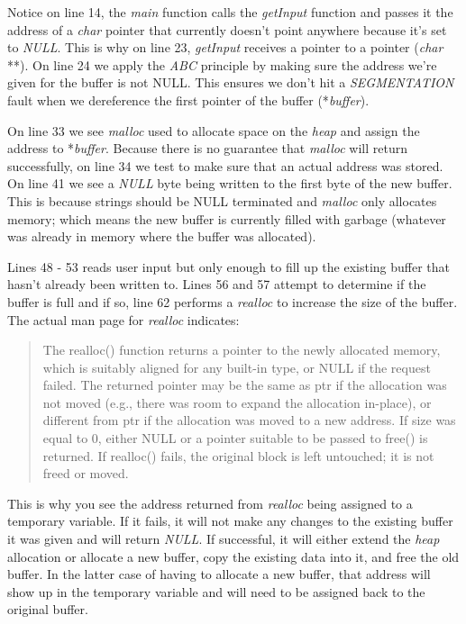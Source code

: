 \documentclass[../main.tex]{subfiles}
\begin{document}
	Notice on line 14, the \textit{main} function calls the \textit{getInput} function and passes it the address of a \textit{char} pointer that currently doesn't point anywhere because it's set to \textit{NULL}.  This is why on line 23, \textit{getInput} receives a pointer to a pointer (\textit{char} **).  On line 24 we apply the \textit{ABC} principle by making sure the address we're given for the buffer is not NULL.  This ensures we don't hit a \textit{SEGMENTATION} fault when we dereference the first pointer  of the buffer (*\textit{buffer}). 
	
	On line 33 we see \textit{malloc} used to allocate space on the \textit{heap} and assign the address to *\textit{buffer}.  Because there is no guarantee that \textit{malloc} will return successfully, on line 34 we test to make sure that an actual address was stored.  On line 41 we see a \textit{NULL} byte being written to the first byte of the new buffer.  This is because strings should be NULL terminated and \textit{malloc} only allocates memory; which means the new buffer is currently filled with garbage (whatever was already in memory where the buffer was allocated).
	
	Lines 48 - 53 reads user input but only enough to fill up the existing buffer that hasn't already been written to.  Lines 56 and 57 attempt to determine if the buffer is full and if so, line 62 performs a \textit{realloc} to increase the size of the buffer.  The actual man page for \textit{realloc} indicates:
	
	\begin{quotation}
		The realloc() function returns a pointer to the newly allocated memory, which is suitably aligned for any built-in type, or NULL if the request failed.  The returned pointer may be the same  as  ptr
		if  the allocation was not moved (e.g., there was room to expand the allocation in-place), or different from ptr if the allocation was moved to a new address.  If size was equal to 0, either NULL or
		a pointer suitable to be passed to free() is returned.  If realloc() fails, the original block is left untouched; it is not freed or moved.
	\end{quotation}

	This is why you see the address returned from \textit{realloc} being assigned to a temporary variable.  If it fails, it will not make any changes to the existing buffer it was given and will return \textit{NULL}.  If successful, it will either extend the \textit{heap} allocation or allocate a new buffer, copy the existing data into it, and free the old buffer.  In the latter case of having to allocate a new buffer, that address will show up in the temporary variable and will need to be assigned back to the original buffer.  
	
\end{document}
